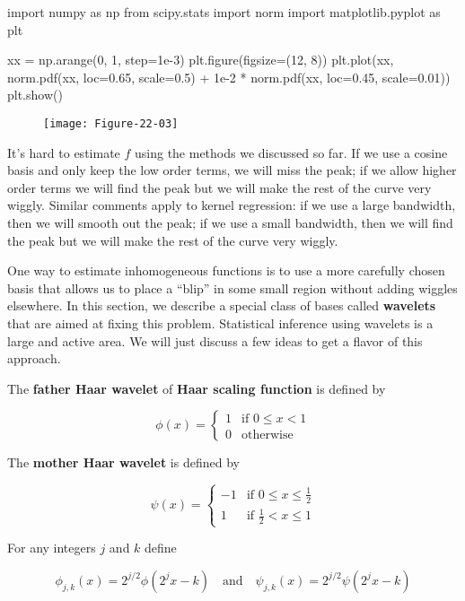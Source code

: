 \begin{python}
import numpy as np
from scipy.stats import norm
import matplotlib.pyplot as plt

xx = np.arange(0, 1, step=1e-3)
plt.figure(figsize=(12, 8))
plt.plot(xx, norm.pdf(xx, loc=0.65, scale=0.5) + 1e-2 * norm.pdf(xx, loc=0.45, scale=0.01))
plt.show()
\end{python}

\begin{figure}[H]
\texttt{[image: Figure-22-03]}
\end{figure}

It's hard to estimate \(f\) using the methods we discussed so far. If we
use a cosine basis and only keep the low order terms, we will miss the
peak; if we allow higher order terms we will find the peak but we will
make the rest of the curve very wiggly. Similar comments apply to kernel
regression: if we use a large bandwidth, then we will smooth out the
peak; if we use a small bandwidth, then we will find the peak but we
will make the rest of the curve very wiggly.

One way to estimate inhomogeneous functions is to use a more carefully
chosen basis that allows us to place a ``blip'' in some small region
without adding wiggles elsewhere. In this section, we describe a special
class of bases called \textbf{wavelets} that are aimed at fixing this
problem. Statistical inference using wavelets is a large and active
area. We will just discuss a few ideas to get a flavor of this approach.

The \textbf{father Haar wavelet} of \textbf{Haar scaling function} is
defined by

\[ \phi(x) = \begin{cases}
1 & \text{if } 0 \leq x < 1 \\
0 & \text{otherwise}
\end{cases} \]

The \textbf{mother Haar wavelet} is defined by

\[
\psi(x) = \begin{cases}
-1 & \text{if } 0 \leq x \leq \frac{1}{2} \\
1  & \text{if } \frac{1}{2} < x \leq 1
\end{cases}
\]

For any integers \(j\) and \(k\) define

\[ \phi_{j, k}(x) = 2^{j/2} \phi(2^j x - k) 
\quad \text{and} \quad
\psi_{j, k}(x) = 2^{j/2} \psi(2^j x - k)
\]


